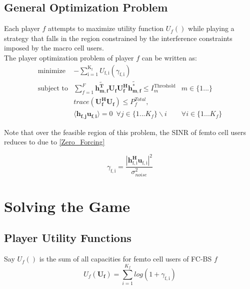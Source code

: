 \documentclass[12pt]{article}
\begin{document}
\subsection{General Optimization Problem}

Each player $f$ attempts to maximize utility function $U_f()$ while playing a strategy that falls in the region constrained by the interference constraints imposed by the macro cell users.
\\

The player optimization problem of player $f$ can be written as:
    \begin{equation}
    \begin{array}{lll}
    \mbox{minimize}   & - \sum_{\mathrm{i=1}}^{\mathrm{K_f}}
    U_{\mathrm{f,i}}(\gamma_{\mathrm{f,i}})  
  	\\
    \mbox{subject to} 
    &  \sum^F_{f=1} \mathbf{\tilde{h_{m,f}^T}}  \mathbf{U_f}  \mathbf{U_f^H}
    \mathbf{\tilde{h_{m,f}^*}} \leq I^{\mathrm{Threshold}}_{m} & m \in \{1 ... 
    \} 
    \\
    & trace(\mathbf{U_f^H}\mathbf{U_f}) \leq P^{Total}_{f},
    \\
    & \langle \mathbf{h_{f,j}}\mathbf{u_{f,i}} \rangle =0\ \; \forall j \in \{1
    ... K_f\}\backslash i &\forall i \in \{1 ... K_f\} 
    \end{array}
    \label{player_opt}
    \end{equation}

Note that over the feasible region of this problem, the SINR of femto cell users reduces to due to  \eqref{Zero_Forcing}

\begin{equation}\label{zf_snr}
\gamma_{\mathrm{f,i}} = \frac{|\mathbf{h^H_{\mathrm{f,i}}u_{\mathrm{f,i}}}|^2}
{\sigma^2_{noise}  
}
\end{equation}

\section{Solving the Game}
\subsection{Player Utility Functions}

Say $U_f() $ is the sum of all capacities for femto cell users of FC-BS $f$ 
\begin{displaymath}
U_f(\mathbf{U_f}) = \sum^{K_f}_{i=1} log(1+\gamma_{\mathrm{f,i}})
\end{displaymath}
\end{document}
